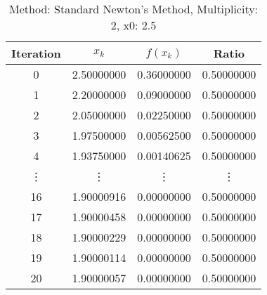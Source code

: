 \begin{table}
\centering
\caption{Method: Standard Newton's Method, Multiplicity: 2, x0: 2.5}
\label{tab:table_Standard_Newton's_Method_2_2_5}
\begin{tabular}{c c c c}
\toprule
Iteration &      $x_k$ &   $f(x_k)$ &      Ratio \\
\midrule
        0 & 2.50000000 & 0.36000000 & 0.50000000 \\
        1 & 2.20000000 & 0.09000000 & 0.50000000 \\
        2 & 2.05000000 & 0.02250000 & 0.50000000 \\
        3 & 1.97500000 & 0.00562500 & 0.50000000 \\
        4 & 1.93750000 & 0.00140625 & 0.50000000 \\
   \vdots &     \vdots &     \vdots &     \vdots \\
       16 & 1.90000916 & 0.00000000 & 0.50000000 \\
       17 & 1.90000458 & 0.00000000 & 0.50000000 \\
       18 & 1.90000229 & 0.00000000 & 0.50000000 \\
       19 & 1.90000114 & 0.00000000 & 0.50000000 \\
       20 & 1.90000057 & 0.00000000 & 0.50000000 \\
\bottomrule
\end{tabular}
\end{table}
